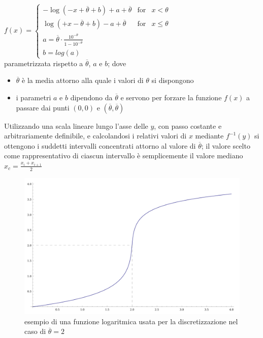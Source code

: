 $f(x) =	\left\{ \begin{array}{rcl}  
	-\log(-x+\overline{\theta}+b) + a + \overline{\theta} & \mbox{for} & x<\theta \\ 
	\log(+x-\overline{\theta}+b) - a + \overline{\theta} & \mbox{for} & x\leq\theta \\ 
	a = \overline{\theta}\cdot \frac{10^{-\overline{\theta}}}{1 - 10^{-\overline{\theta}}} & & \\ 
	b = log(a) \end{array} 
 \right.$ 	\\

parametrizzata rispetto a $\overline{\theta}$, $a$ e $b$; dove 
\begin{itemize}
\item $\overline{\theta}$ \`e la media attorno alla quale i valori di $\theta$ si dispongono
\item i parametri $a$ e $b$ dipendono da $\overline{\theta}$ e servono per forzare la funzione $f(x)$ a passare dai punti $(0,0)$ e $(\overline{\theta},\overline{\theta})$
\end{itemize}

Utilizzando una scala lineare lungo l'asse delle $y$, con passo costante e arbitrariamente definibile, e calcolandosi i relativi valori di $x$ mediante $f^{-1}(y)$ si ottengono i suddetti intervalli concentrati attorno al valore di $\overline{\theta}$; il valore scelto come rappresentativo di ciascun intervallo \`e semplicemente il valore mediano $x_{c} = \frac{x_{i} + x_{i + 1}}{2}$ \\

\begin{figure}[!h]{
	\begin{center}
	   \includegraphics[width=\textwidth]{figures/loga-ritmo-per-ballare.png}
	\end{center}}
	\caption{esempio di una funzione logaritmica usata per la discretizzazione nel caso di $\overline{\theta} = 2$}
	\label{fig:log}
\end{figure}


